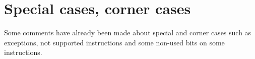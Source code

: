 \section{Special cases, corner cases}
Some comments have already been made about special and corner cases such as exceptions, not supported instructions and some non-used bits on some instructions.